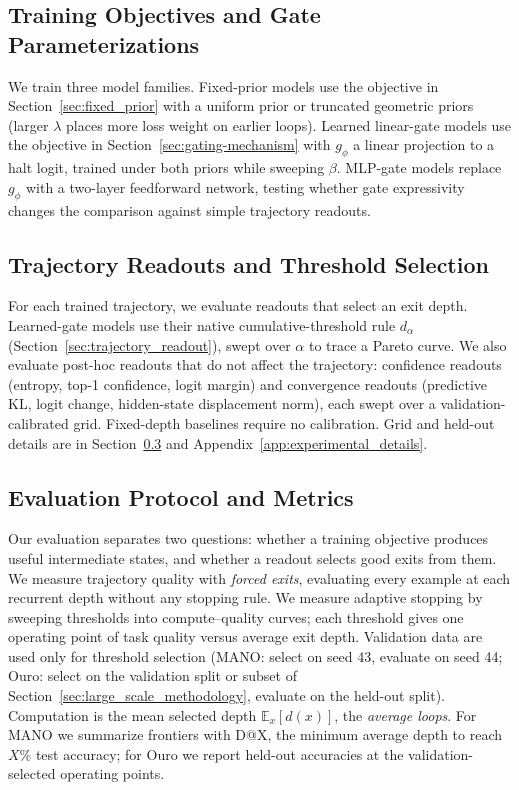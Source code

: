 \documentclass[10pt]{article} %
\begin{document}
\subsection{Training Objectives and Gate Parameterizations}

We train three model families. Fixed-prior models use the objective in Section~\ref{sec:fixed_prior} with a uniform prior or truncated geometric priors (larger \(\lambda\) places more loss weight on earlier loops). Learned linear-gate models use the objective in Section~\ref{sec:gating-mechanism} with \(g_\phi\) a linear projection to a halt logit, trained under both priors while sweeping \(\beta\). MLP-gate models replace \(g_\phi\) with a two-layer feedforward network, testing whether gate expressivity changes the comparison against simple trajectory readouts.

\subsection{Trajectory Readouts and Threshold Selection}

For each trained trajectory, we evaluate readouts that select an exit depth. Learned-gate models use their native cumulative-threshold rule \(d_\alpha\) (Section~\ref{sec:trajectory_readout}), swept over \(\alpha\) to trace a Pareto curve. We also evaluate post-hoc readouts that do not affect the trajectory: confidence readouts (entropy, top-1 confidence, logit margin) and convergence readouts (predictive KL, logit change, hidden-state displacement norm), each swept over a validation-calibrated grid. Fixed-depth baselines require no calibration. Grid and held-out details are in Section~\ref{sec:evaluation_metrics} and Appendix~\ref{app:experimental_details}.

\subsection{Evaluation Protocol and Metrics}
\label{sec:evaluation_metrics}

Our evaluation separates two questions: whether a training objective produces useful intermediate states, and whether a readout selects good exits from them. We measure trajectory quality with \emph{forced exits}, evaluating every example at each recurrent depth without any stopping rule. We measure adaptive stopping by sweeping thresholds into compute--quality curves; each threshold gives one operating point of task quality versus average exit depth. Validation data are used only for threshold selection (MANO: select on seed 43, evaluate on seed 44; Ouro: select on the validation split or subset of Section~\ref{sec:large_scale_methodology}, evaluate on the held-out split). Computation is the mean selected depth \(\mathbb{E}_x[d(x)]\), the \emph{average loops}. For MANO we summarize frontiers with D@X, the minimum average depth to reach $X\%$ test accuracy; for Ouro we report held-out accuracies at the validation-selected operating points.
\end{document}
